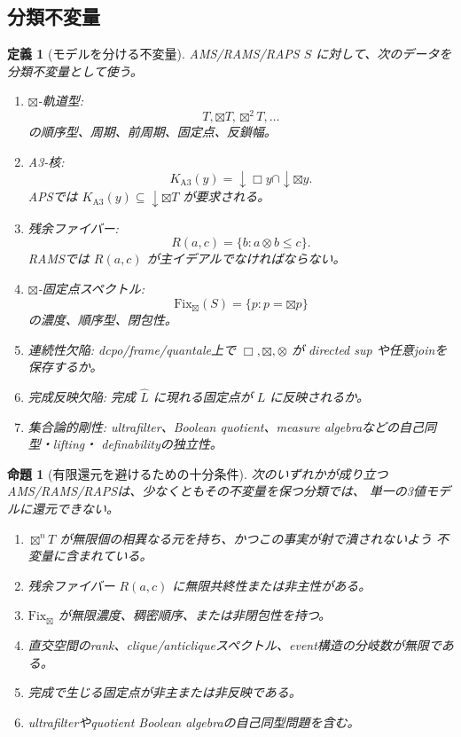 \documentclass[uplatex,dvipdfmx,a4paper,10pt]{jsarticle}
\newtheorem{proposition}[theorem]{命題}
\newtheorem{definition}[theorem]{定義}
\newcommand{\Fix}{\mathrm{Fix}}
\newcommand{\bt}{\boxtimes}
\begin{document}
\subsection{分類不変量}

\begin{definition}[モデルを分ける不変量]
AMS/RAMS/RAPS \(S\) に対して、次のデータを分類不変量として使う。
\begin{enumerate}
  \item \(\bt\)-軌道型:
  \[
  T,\bt T,\bt^2T,\ldots
  \]
  の順序型、周期、前周期、固定点、反鎖幅。
  \item A3-核:
  \[
  K_{\mathrm{A3}}(y)=\downarrow\Box y\cap\downarrow\bt y.
  \]
  APSでは \(K_{\mathrm{A3}}(y)\subseteq\downarrow\bt T\) が要求される。
  \item 残余ファイバー:
  \[
  R(a,c)=\{b:a\otimes b\le c\}.
  \]
  RAMSでは \(R(a,c)\) が主イデアルでなければならない。
  \item \(\bt\)-固定点スペクトル:
  \[
  \Fix_{\bt}(S)=\{p:p=\bt p\}
  \]
  の濃度、順序型、閉包性。
  \item 連続性欠陥:
  dcpo/frame/quantale上で \(\Box,\bt,\otimes\) が directed sup や任意joinを
  保存するか。
  \item 完成反映欠陥:
  完成 \(\widehat L\) に現れる固定点が \(L\) に反映されるか。
  \item 集合論的剛性:
  ultrafilter、Boolean quotient、measure algebraなどの自己同型・lifting・
  definabilityの独立性。
\end{enumerate}
\end{definition}

\begin{proposition}[有限還元を避けるための十分条件]
次のいずれかが成り立つAMS/RAMS/RAPSは、少なくともその不変量を保つ分類では、
単一の3値モデルに還元できない。
\begin{enumerate}
  \item \(\bt^nT\) が無限個の相異なる元を持ち、かつこの事実が射で潰されないよう
  不変量に含まれている。
  \item 残余ファイバー \(R(a,c)\) に無限共終性または非主性がある。
  \item \(\Fix_{\bt}\) が無限濃度、稠密順序、または非閉包性を持つ。
  \item 直交空間のrank、clique/anticliqueスペクトル、event構造の分岐数が無限である。
  \item 完成で生じる固定点が非主または非反映である。
  \item ultrafilterやquotient Boolean algebraの自己同型問題を含む。
\end{enumerate}
\end{proposition}
\end{document}
